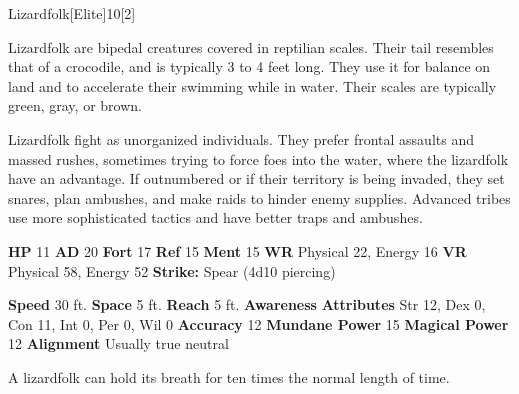   \begin{monsection}{Lizardfolk}[Elite]{10}[2]
    \vspace{-1em}\vspace{-1em}
    \vspace{0em}

    
    Lizardfolk are bipedal creatures covered in reptilian scales.
    Their tail resembles that of a crocodile, and is typically 3 to 4 feet long.
    They use it for balance on land and to accelerate their swimming while in water.
    Their scales are typically green, gray, or brown.

    Lizardfolk fight as unorganized individuals.
    They prefer frontal assaults and massed rushes, sometimes trying to force foes into the water, where the lizardfolk have an advantage.
    If outnumbered or if their territory is being invaded, they set snares, plan ambushes, and make raids to hinder enemy supplies.
    Advanced tribes use more sophisticated tactics and have better traps and ambushes.
  
    

    \begin{spellcontent}
      \begin{spelltargetinginfo}
        \pari \textbf{HP} 11 \monsep
          \textbf{AD} 20 \monsep
          \textbf{Fort} 17 \monsep
          \textbf{Ref} 15 \monsep
          \textbf{Ment} 15
        \pari \textbf{WR} Physical 22, Energy 16 \monsep
        \textbf{VR} Physical 58, Energy 52
        \pari \textbf{Strike:}
            Spear  (4d10 piercing)
      \end{spelltargetinginfo}
    \end{spellcontent}
    \begin{monsterfooter}
      \pari \textbf{Speed} 30 ft. \monsep
        \textbf{Space} 5 ft. \monsep
        \textbf{Reach} 5 ft.
      \pari \textbf{Awareness} 
      \pari \textbf{Attributes}
        Str 12, Dex 0,
        Con 11, Int 0,
        Per 0, Wil 0
      \pari \textbf{Accuracy} 12 \monsep
        \textbf{Mundane Power} 15 \monsep
      \textbf{Magical Power} 12
      \pari \textbf{Alignment} Usually true neutral
    \end{monsterfooter}
  \end{monsection}
   A lizardfolk can hold its breath for ten times the normal length of time.
  
